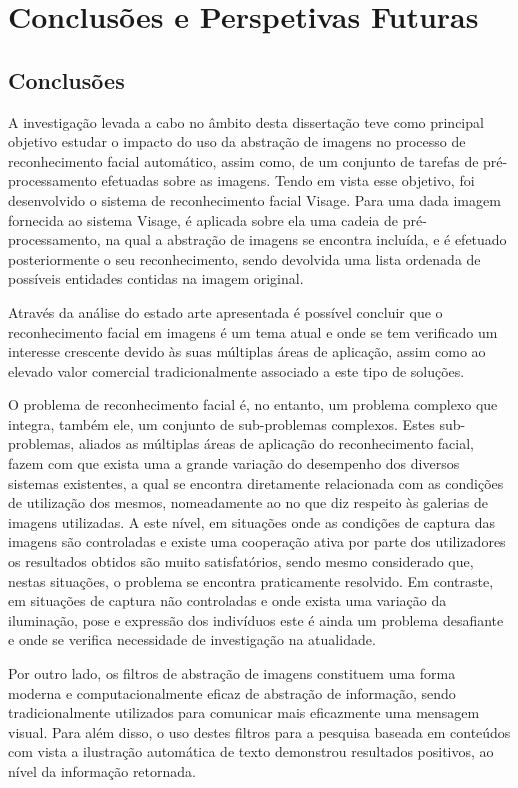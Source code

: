 \chapter{Conclusões e Perspetivas Futuras} \label{chap:conclusao}

\section{Conclusões}
A investigação levada a cabo no âmbito desta dissertação teve como principal objetivo estudar o impacto do uso da abstração de imagens no processo de reconhecimento facial automático, assim como, de um conjunto de tarefas de pré-processamento efetuadas sobre as imagens. Tendo em vista esse objetivo, foi desenvolvido o sistema de reconhecimento facial Visage. Para uma dada imagem fornecida ao sistema Visage, é aplicada sobre ela uma cadeia de pré-processamento, na qual a abstração de imagens se encontra incluída, e é efetuado posteriormente o seu reconhecimento, sendo devolvida uma lista ordenada de possíveis entidades contidas na imagem original.

Através da análise do estado arte apresentada é possível concluir que o reconhecimento facial em imagens é um tema atual e onde se tem verificado um interesse crescente devido às suas múltiplas áreas de aplicação, assim como ao elevado valor comercial tradicionalmente associado a este tipo de soluções. 

O problema de reconhecimento facial é, no entanto, um problema complexo que integra, também ele, um conjunto de sub-problemas  complexos. Estes sub-problemas, aliados as múltiplas áreas de aplicação do reconhecimento facial, fazem com que exista uma a grande variação do desempenho dos diversos sistemas existentes, a qual se encontra diretamente relacionada com as condições de utilização dos mesmos, nomeadamente ao no que diz respeito às galerias de imagens utilizadas. A este nível, em situações onde as condições de captura das imagens são controladas e existe uma cooperação ativa por parte dos utilizadores os resultados obtidos são muito satisfatórios, sendo mesmo considerado que, nestas situações, o problema se encontra praticamente resolvido. Em contraste, em situações de captura não controladas e onde exista uma variação da iluminação, pose e expressão dos indivíduos este é ainda um problema desafiante e onde se verifica necessidade de investigação na atualidade.

Por outro lado, os filtros de abstração de imagens constituem uma forma moderna e computacionalmente eficaz de abstração de informação, sendo tradicionalmente utilizados para comunicar mais eficazmente uma mensagem visual. Para além disso, o uso destes filtros para a pesquisa baseada em conteúdos com vista a ilustração automática de texto demonstrou resultados positivos, ao nível da informação retornada.

